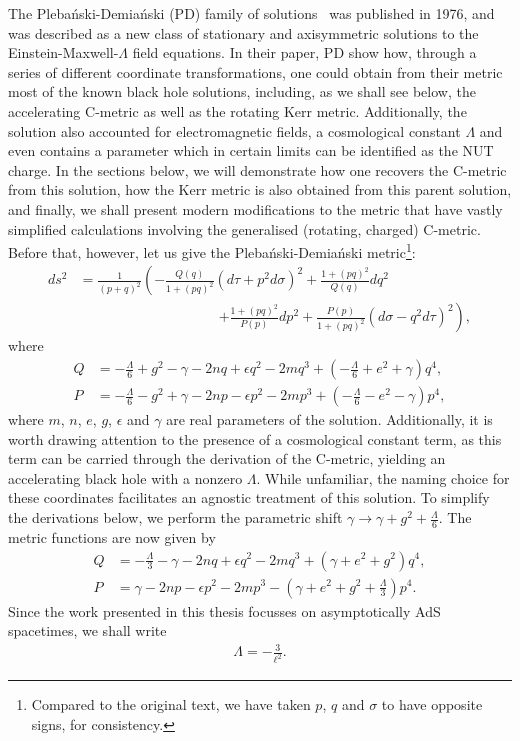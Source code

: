 \documentclass[
twoside,
openright,
frontopenright,
]{dmathesis}
\newcommand{\nn}{\nonumber}
\begin{document}
The Pleba\'nski-Demia\'nski (PD) family of solutions~\cite{Plebanski:1976gy} was
published in 1976, and was described as a new class of stationary and
axisymmetric solutions to the Einstein-Maxwell-$\Lambda$ field equations. In
their paper, PD show how, through a series of different coordinate
transformations, one could obtain from their metric most of the known black hole
solutions, including, as we shall see below, the accelerating C-metric as well
as the rotating Kerr metric. Additionally, the solution also accounted for
electromagnetic fields, a cosmological constant $\Lambda$ and even contains a
parameter which in certain limits can be identified as the NUT charge. In the
sections below, we will demonstrate how one recovers the C-metric from this
solution, how the Kerr metric is also obtained from this parent solution, and
finally, we shall present modern modifications to the metric that have vastly
simplified calculations involving the generalised (rotating, charged)
C-metric. Before that, however, let us give the Pleba\'nski-Demia\'nski
metric\footnote{Compared to the original text, we have taken $p$, $q$ and
  $\sigma$ to have opposite signs, for consistency.}:
\begin{align}
  \label{eq:PD}
  ds^2 &= \frac{1}{(p + q)^2} \left( - \frac{Q(q)}{1+(pq)^2}(d\tau + p^2
         d\sigma)^2 + \frac{1+(pq)^2}{Q(q)}dq^2 \right.\nn\\
  &\hspace{10em}\left.+ \frac{1+(pq)^2}{P(p)}dp^2 +
         \frac{P(p)}{1+(pq)^2}(d\sigma - q^2 d\tau)^2 \right), 
\end{align}
where
\begin{align}
  Q &= -\frac{\Lambda}{6} + g^2 - \gamma - 2nq + \epsilon q^2 -
      2mq^3 + \left(-\frac{\Lambda}{6}+e^2+\gamma\right)q^4,\nn\\
  P &= -\frac{\Lambda}{6} - g^2 + \gamma - 2np - \epsilon p^2 -
      2mp^3 + \left(-\frac{\Lambda}{6}-e^2-\gamma\right)p^4,
\end{align}
where $m$, $n$, $e$, $g$, $\epsilon$ and $\gamma$ are real parameters of the
solution. Additionally, it is worth drawing attention to the presence of a
cosmological constant term, as this term can be carried through the derivation of
the C-metric, yielding an accelerating black hole with a nonzero
$\Lambda$. While unfamiliar, the naming choice for these coordinates facilitates
an agnostic treatment of this solution. To simplify the derivations below, we
perform the parametric shift $\gamma\to \gamma + g^2 +\frac{\Lambda}{6}$. The
metric functions are now given by
\begin{align}
  \label{eq:PDfn}
  Q &= -\frac{\Lambda}{3} - \gamma - 2nq + \epsilon q^2 -
      2mq^3 + \left(\gamma + e^2 + g^2\right)q^4,\nn\\
  P &=  \gamma - 2np - \epsilon p^2 -
      2mp^3 - \left(\gamma+e^2+g^2+\frac{\Lambda}{3}\right)p^4.
\end{align}
Since the work presented in this thesis focusses on asymptotically AdS
spacetimes, we shall write
\begin{align*}
  \Lambda=-\frac{3}{\ell^2}.
\end{align*}
\end{document}
